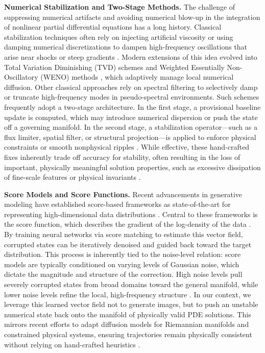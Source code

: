 \documentclass[letterpaper]{article} %
\begin{document}
\textbf{Numerical Stabilization and Two-Stage Methods.} 
The challenge of suppressing numerical artifacts and avoiding numerical blow-up in the integration of nonlinear partial differential equations has a long history. Classical stabilization techniques often rely on injecting artificial viscosity or using damping numerical discretizations to dampen high-frequency oscillations that arise near shocks or steep gradients \citep{vonneumann1950method}. Modern extensions of this idea evolved into Total Variation Diminishing (TVD) schemes \citep{harten1997high} and Weighted Essentially Non-Oscillatory (WENO) methods \citep{jiang1996efficient}, which adaptively manage local numerical diffusion. Other classical approaches rely on spectral filtering \citep{gottlieb2001spectral} to selectively damp or truncate high-frequency modes in pseudo-spectral environments. Such schemes frequently adopt a two-stage architecture. In the first stage, a provisional baseline update is computed, which may introduce numerical dispersion or push the state off a governing manifold. In the second stage, a stabilization operator—such as a flux limiter, spatial filter, or structural projection—is applied to enforce physical constraints or smooth nonphysical ripples \citep{maccormack2003effect}. While effective, these hand-crafted fixes inherently trade off accuracy for stability, often resulting in the loss of important, physically meaningful solution properties, such as excessive dissipation of fine-scale features or physical invariants \citep{godunov1959difference, leveque2002finite}.


\textbf{Score Models and Score Functions.} 
Recent advancements in generative modeling have established score-based frameworks as state-of-the-art for representing high-dimensional data distributions \citep{ho2020denoising}. Central to these frameworks is the score function, which describes the gradient of the log-density of the data \citep{Song2021ScoreBasedSDE}. By training neural networks via score matching to estimate this vector field, corrupted states can be iteratively denoised and guided back toward the target distribution. This process is inherently tied to the noise-level relation: score models are typically conditioned on varying levels of Gaussian noise, which dictate the magnitude and structure of the correction. High noise levels pull severely corrupted states from broad domains toward the general manifold, while lower noise levels refine the local, high-frequency structure \citep{meng2021sdedit}. In our context, we leverage this learned vector field not to generate images, but to push an unstable numerical state back onto the manifold of physically valid PDE solutions. This mirrors recent efforts to adapt diffusion models for Riemannian manifolds and constrained physical systems, ensuring trajectories remain physically consistent without relying on hand-crafted heuristics \citep{de2022riemannian}.
\end{document}
